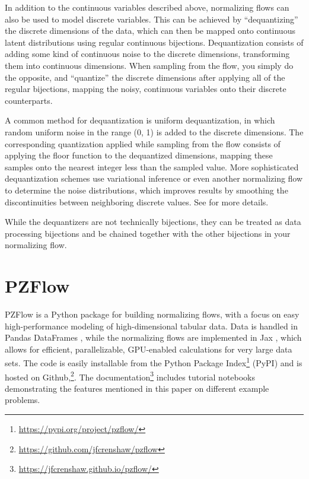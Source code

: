 \documentclass[twocolumn,twocolappendix,linenumbers]{aastex631}
\begin{document}
In addition to the continuous variables described above, normalizing flows can also be used to model discrete variables.
This can be achieved by ``dequantizing'' the discrete dimensions of the data, which can then be mapped onto continuous latent distributions using regular continuous bijections.
Dequantization consists of adding some kind of continuous noise to the discrete dimensions, transforming them into continuous dimensions.
When sampling from the flow, you simply do the opposite, and ``quantize'' the discrete dimensions after applying all of the regular bijections, mapping the noisy, continuous variables onto their discrete counterparts.

A common method for dequantization is uniform dequantization, in which random uniform noise in the range (0, 1) is added to the discrete dimensions.
The corresponding quantization applied while sampling from the flow consists of applying the floor function to the dequantized dimensions, mapping these samples onto the nearest integer less than the sampled value.
More sophisticated dequantization schemes use variational inference or even another normalizing flow to determine the noise distributions, which improves results by smoothing the discontinuities between neighboring discrete values.
See \citet{ho2019} \citet{hoogeboom2020} for more details.

While the dequantizers are not technically bijections, they can be treated as data processing bijections and be chained together with the other bijections in your normalizing flow.


\section{PZFlow}
\label{sec:pzflow}

PZFlow is a Python package for building normalizing flows, with a focus on easy high-performance modeling of high-dimensional tabular data.
Data is handled in Pandas DataFrames \citep{pandas}, while the normalizing flows are implemented in Jax \citep{jax}, which allows for efficient, parallelizable, GPU-enabled calculations for very large data sets.
The code is easily installable from the Python Package Index\footnote{\url{https://pypi.org/project/pzflow/}} (PyPI) and is hosted on Github,\footnote{\url{https://github.com/jfcrenshaw/pzflow}}.
The documentation\footnote{\url{https://jfcrenshaw.github.io/pzflow/}} includes tutorial notebooks demonstrating the features mentioned in this paper on different example problems.
\end{document}
